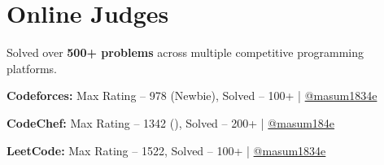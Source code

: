 \section{Online Judges}

\begin{onecolentry}
    \begin{highlights}

        \item Solved over \textbf{500+ problems} across multiple competitive programming platforms.

        \item \textbf{Codeforces:} 
        Max Rating -- 978 (Newbie), Solved -- 100+ |
        \href{https://www.codeforces.com/profile/masum1834e}{@masum1834e}

        \item \textbf{CodeChef:} 
        Max Rating -- 1342 (\faStar), Solved -- 200+ |
        \href{https://www.codechef.com/users/masum184e}{@masum184e}

        \item \textbf{LeetCode:} 
        Max Rating -- 1522, Solved -- 100+ |
        \href{https://www.leetcode.com/u/masum1834e}{@masum1834e}

    \end{highlights}
\end{onecolentry}